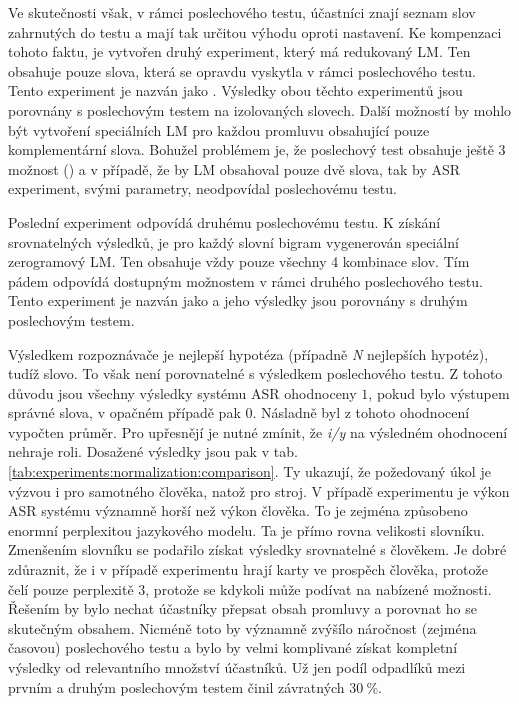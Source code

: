 Ve skutečnosti však, v rámci poslechového testu, účastníci znají seznam slov zahrnutých do testu a mají tak určitou výhodu oproti  nastavení. Ke kompenzaci tohoto faktu, je vytvořen druhý experiment, který má redukovaný LM. Ten obsahuje pouze slova, která se opravdu vyskytla v rámci poslechového testu. Tento experiment je nazván jako . Výsledky obou těchto experimentů jsou porovnány s poslechovým testem na izolovaných slovech. Další možností by mohlo být vytvoření speciálních LM pro každou promluvu obsahující pouze komplementární slova. Bohužel problémem je, že poslechový test obsahuje ještě 3 možnost () a v případě, že by LM obsahoval pouze dvě slova, tak by ASR experiment, svými parametry, neodpovídal poslechovému testu.

Poslední experiment odpovídá druhému poslechovému testu. K získání srovnatelných výsledků, je pro každý slovní bigram vygenerován speciální zerogramový LM. Ten obsahuje vždy pouze všechny 4 kombinace slov. Tím pádem odpovídá dostupným možnostem v rámci druhého poslechového testu. Tento experiment je nazván jako  a jeho výsledky jsou porovnány s druhým poslechovým testem.

Výsledkem rozpoznávače je nejlepší hypotéza (případně \textit{N} nejlepších hypotéz), tudíž slovo. To však není porovnatelné s výsledkem poslechového testu. Z tohoto důvodu jsou všechny výsledky systému ASR ohodnoceny $1$, pokud bylo výstupem správné slova, v opačném případě pak $0$. Násladně byl z tohoto ohodnocení vypočten průměr. Pro upřesnějí je nutné zmínit, že \textit{i/y} na výsledném ohodnocení nehraje roli. Dosažené výsledky jsou pak v tab. \ref{tab:experiments:normalization:comparison}. Ty ukazují, že požedovaný úkol je výzvou i pro samotného člověka, natož pro stroj. V případě experimentu  je výkon ASR systému významně horší než výkon člověka. To je zejména způsobeno enormní perplexitou jazykového modelu. Ta je přímo rovna velikosti slovníku. Zmenšením slovníku se podařilo získat výsledky srovnatelné s člověkem. Je dobré zdůraznit, že i v případě  experimentu hrají karty ve prospěch člověka, protože čelí pouze perplexitě $3$, protože se kdykoli může podívat na nabízené možnosti. Řešením by bylo nechat účastníky přepsat obsah promluvy a porovnat ho se skutečným obsahem. Nicméně toto by významně zvýšílo náročnost (zejména časovou) poslechového testu a bylo by velmi komplivané získat kompletní výsledky od relevantního množství účastníků. Už jen podíl odpadlíků mezi prvním a druhým poslechovým testem činil závratných $30\ \%$.

